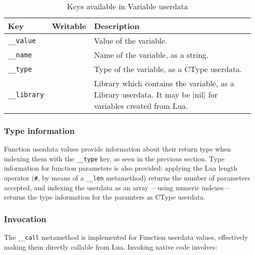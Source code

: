 \begin{table}[ht]
	\centering
	\begin{tabular}{lcp{}}
		\toprule
		Key & Writable & Description \\
		\midrule
		\texttt{\_\_value} & \Tick & Value of the variable. \\
		\texttt{\_\_name} & & Name of the variable, as a string. \\
		\texttt{\_\_type} & & Type of the variable, as a \textsf{CType} userdata. \\
		\texttt{\_\_library} & & Library which contains the variable, as
			a \textsf{Library} userdata. It may be \Mlua|nil| for variables created from Lua. \\
		\bottomrule
	\end{tabular}
	\caption{Keys available in \textsf{Variable} userdata}
	\label{tab:eol-api-variable-keys}
\end{table}



\subsubsection{Type information}

\textsf{Function} userdata values provide information about their return type
when indexing them with the \texttt{\_\_type} key, as seen in the previous
section. Type information for function parameters is also provided: applying
the Lua length operator (\texttt\#, by means of a \texttt{\_\_len} metamethod)
returns the number of parameters accepted, and indexing the userdata as an
array —using numeric indexes— returns the type information for the paramters
as \textsf{CType} userdata.


\subsubsection{Invocation}

The \texttt{\_\_call} metamethod is implemented for \textsf{Function}
userdata values, effectively making them directly callable from Lua. Invoking
native code involves:

